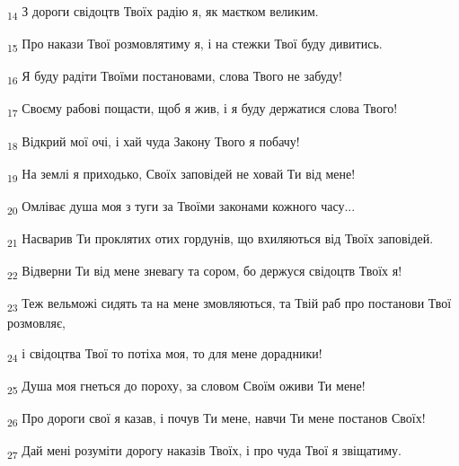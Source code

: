 \begin{tcolorbox}
\textsubscript{14} З дороги свідоцтв Твоїх радію я, як маєтком великим.
\end{tcolorbox}
\begin{tcolorbox}
\textsubscript{15} Про накази Твої розмовлятиму я, і на стежки Твої буду дивитись.
\end{tcolorbox}
\begin{tcolorbox}
\textsubscript{16} Я буду радіти Твоїми постановами, слова Твого не забуду!
\end{tcolorbox}
\begin{tcolorbox}
\textsubscript{17} Своєму рабові пощасти, щоб я жив, і я буду держатися слова Твого!
\end{tcolorbox}
\begin{tcolorbox}
\textsubscript{18} Відкрий мої очі, і хай чуда Закону Твого я побачу!
\end{tcolorbox}
\begin{tcolorbox}
\textsubscript{19} На землі я приходько, Своїх заповідей не ховай Ти від мене!
\end{tcolorbox}
\begin{tcolorbox}
\textsubscript{20} Омліває душа моя з туги за Твоїми законами кожного часу...
\end{tcolorbox}
\begin{tcolorbox}
\textsubscript{21} Насварив Ти проклятих отих гордунів, що вхиляються від Твоїх заповідей.
\end{tcolorbox}
\begin{tcolorbox}
\textsubscript{22} Відверни Ти від мене зневагу та сором, бо держуся свідоцтв Твоїх я!
\end{tcolorbox}
\begin{tcolorbox}
\textsubscript{23} Теж вельможі сидять та на мене змовляються, та Твій раб про постанови Твої розмовляє,
\end{tcolorbox}
\begin{tcolorbox}
\textsubscript{24} і свідоцтва Твої то потіха моя, то для мене дорадники!
\end{tcolorbox}
\begin{tcolorbox}
\textsubscript{25} Душа моя гнеться до пороху, за словом Своїм оживи Ти мене!
\end{tcolorbox}
\begin{tcolorbox}
\textsubscript{26} Про дороги свої я казав, і почув Ти мене, навчи Ти мене постанов Своїх!
\end{tcolorbox}
\begin{tcolorbox}
\textsubscript{27} Дай мені розуміти дорогу наказів Твоїх, і про чуда Твої я звіщатиму.
\end{tcolorbox}
